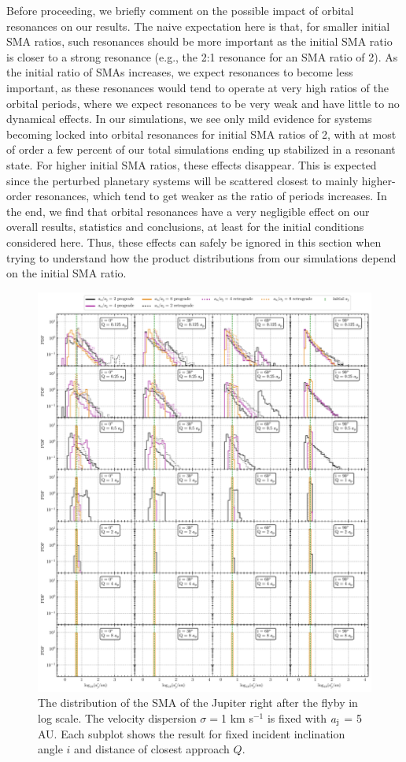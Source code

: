 \documentclass[twocolumn]{aastex63}
\begin{document}
Before proceeding, we briefly comment on the possible impact of orbital resonances on our results.  The naive expectation here is that, for smaller initial SMA ratios, such resonances should be more important as the initial SMA ratio is closer to a strong resonance (e.g., the 2:1 resonance for an SMA ratio of 2).  As the initial ratio of SMAs increases, we expect resonances to become less important, as these resonances would tend to operate at very high ratios of the orbital periods, where we expect resonances to be very weak and have little to no dynamical effects. In our simulations, we see only mild evidence for systems becoming locked into orbital resonances for initial SMA ratios of 2, with at most of order a few percent of our total simulations ending up stabilized in a resonant state.  For higher initial SMA ratios, these effects disappear.  This is expected since the perturbed planetary systems will be scattered closest to mainly higher-order resonances, which tend to get weaker as the ratio of periods increases.  In the end, we find that orbital resonances have a very negligible effect on our overall results, statistics and conclusions, at least for the initial conditions considered here.  Thus, these effects can safely be ignored in this section when trying to understand how the product distributions from our simulations depend on the initial SMA ratio.


\begin{figure}
    \includegraphics[width=\textwidth]{figs/aj-flyby-ratio.pdf}
    \caption{The distribution of the SMA of the Jupiter right after the flyby in log scale. The velocity dispersion $\sigma=$1 km s$^{-1}$ is fixed with $a_{\rm j}$ = 5 AU. Each subplot shows the result for fixed incident inclination angle $i$ and distance of closest approach $Q$.}
    \label{fig:aj-flyby-ratio}
\end{figure}
\end{document}

